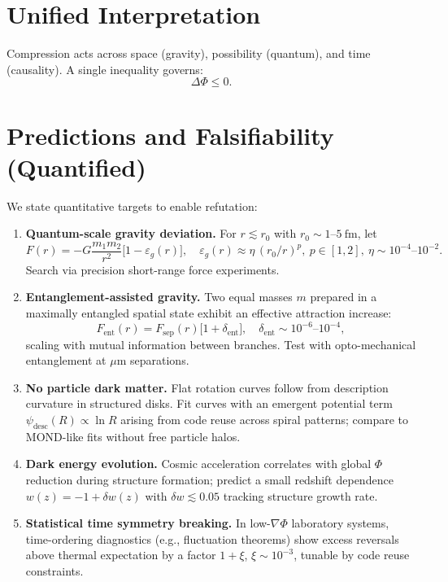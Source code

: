 \documentclass[aps,preprint,onecolumn,longbibliography,nofootinbib]{revtex4-2}
\numberwithin{equation}{section}        %
\begin{document}
\section{Unified Interpretation}
Compression acts across space (gravity), possibility (quantum), and time (causality). A single inequality governs:
\begin{equation}
\boxed{\Delta \Phi \le 0.} \label{eq:law}
\end{equation}

\section{Predictions and Falsifiability (Quantified)}
We state quantitative targets to enable refutation:

\begin{enumerate}
\item \textbf{Quantum-scale gravity deviation.} For $r\lesssim r_0$ with $r_0\sim 1$--$5~\mathrm{fm}$, let
\[
F(r) = -G\frac{m_1m_2}{r^2}\Big[1-\varepsilon_g(r)\Big],\quad \varepsilon_g(r)\approx \eta\,(r_0/r)^p,\ p\in[1,2],\ \eta\sim 10^{-4}\text{--}10^{-2}.
\]
Search via precision short-range force experiments.
\item \textbf{Entanglement-assisted gravity.} Two equal masses $m$ prepared in a maximally entangled spatial state exhibit an effective attraction increase:
\[
F_{\text{ent}}(r)=F_{\text{sep}}(r)\big[1+\delta_{\mathrm{ent}}\big],\quad \delta_{\mathrm{ent}}\sim 10^{-6}\text{--}10^{-4},
\]
scaling with mutual information between branches. Test with opto-mechanical entanglement at $\mu\mathrm{m}$ separations.
\item \textbf{No particle dark matter.} Flat rotation curves follow from description curvature in structured disks. Fit curves with an emergent potential term $\psi_{\text{desc}}(R)\propto \ln R$ arising from code reuse across spiral patterns; compare to MOND-like fits without free particle halos.
\item \textbf{Dark energy evolution.} Cosmic acceleration correlates with global $\Phi$ reduction during structure formation; predict a small redshift dependence $w(z)=-1+\delta w(z)$ with $\delta w\lesssim 0.05$ tracking structure growth rate.
\item \textbf{Statistical time symmetry breaking.} In low-$\nabla\Phi$ laboratory systems, time-ordering diagnostics (e.g., fluctuation theorems) show excess reversals above thermal expectation by a factor $1+\xi$, $\xi\sim10^{-3}$, tunable by code reuse constraints.
\end{enumerate}
\end{document}
